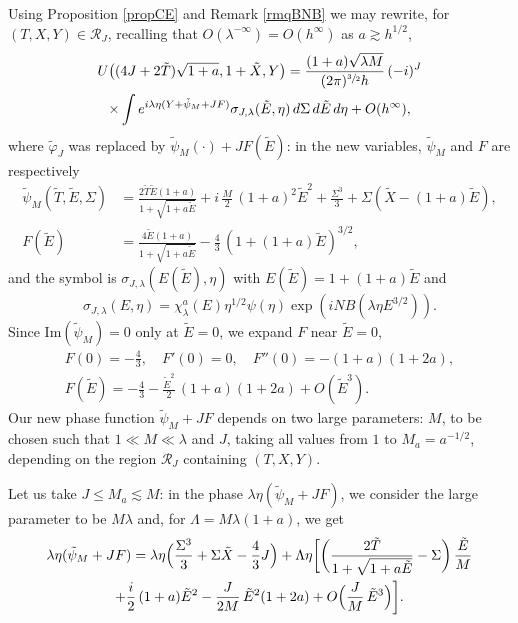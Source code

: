 \documentclass[11pt]{article}
\let\mathcal\mathscr
\theoremstyle{plain}
\theoremstyle{definition}
\newcommand{\DomainXYT}{\mathcal{R}}
\begin{document}
Using Proposition \ref{propCE} and Remark \ref{rmqBNB} we may rewrite, for $(T,X,Y)\in \DomainXYT_{J}$, recalling that $O(\lambda^{-\infty})=O(h^{\infty})$ as $a\gtrsim h^{1/2}$,
\begin{multline}
\label{eq:67}
U\bigl((4J+2\tilde T)\sqrt{1+a},1+\tilde X,Y\bigr) = \frac{(1+a)\sqrt {\lambda M}}{(2\pi)^{\sfrac 32}h}\, (-i)^{J} \\
\times \int e^{i\lambda\eta (Y+\tilde\psi_{M}+JF)} \sigma_{J,\lambda }(\tilde E,\eta)\,d\Sigma \,d{\tilde E} \,d\eta +O(h^{\infty}),
\end{multline}
where $\tilde\varphi_J$ was replaced by $\tilde\psi_{M}(\cdot)+JF({\tilde E})$: in the new variables, $\tilde\psi_{M}$ and $F$ are respectively
\begin{align*}
\tilde\psi_{M} (\tilde T,{\tilde E},\Sigma) & =\frac{2\tilde T {\tilde E}(1+a)}{1+\sqrt{1+a{\tilde E}}}+i\,\frac M2\, (1+a)^2 {\tilde E}^2+\frac{\Sigma^3}{3}+\Sigma(\tilde X-(1+a){\tilde E}), \\
\label{eq:68}
F({\tilde E}) & =\frac{4{\tilde E}(1+a)}{1+\sqrt{1+a{\tilde E}}}-\frac 43\, (1+(1+a){\tilde E})^{3/2},
\end{align*}
and the symbol is $\sigma_{J,\lambda}(E(\tilde E),\eta)$ with $E(\tilde E)=1+(1+a)\tilde E$ and
\[
\sigma_{J,\lambda}(E,\eta)=\chi^a_{\lambda}(E)\eta^{1/2}\psi(\eta) \exp(i NB(\lambda \eta E^{3/2})).
\]
Since $\mathrm{Im}(\tilde\psi_{M})=0$ only at ${\tilde E}=0$, we expand $F$ near ${\tilde E}=0$,
\begin{gather*}
F(0)=-\frac 43, \quad F'(0)=0, \quad F''(0)=-(1+a)(1+2a),\\
F({\tilde E})= -\frac 43-\frac{{\tilde E}^2}{2}\,(1+a)(1+2a)+O({\tilde E}^3).
\end{gather*}
Our new phase function $\tilde\psi_{M}+JF$ depends on two large parameters: $M$, to be chosen such that $1\ll M\ll\lambda $ and $J$, taking all values from $1$ to $M_a=a^{-1/2}$, depending on the region $\DomainXYT_J$ containing $(T,X,Y)$.

Let us take $J\leq M_a\lesssim M$: in the phase $\lambda\eta(\tilde\psi_{M}+JF)$, we consider the large parameter to be $M\lambda$ and, for $\Lambda= M \lambda (1+a)$, we get
\begin{multline*}\label{eq:phaUj}
\lambda\eta(\tilde\psi_{M}+JF)=\lambda \eta \Big(\frac{\Sigma^3}{3}+\Sigma \tilde X-\frac 43 J\Big)+
\Lambda \eta\biggl[\biggl(\frac{2\tilde T}{1+\sqrt{1+a{\tilde E}}}-\Sigma\biggr)\,\frac {\tilde E}M\\
+\frac i2\, (1+a){\tilde E}^2-\frac{J}{2M}\,{\tilde E}^2(1+2a)+O\Bigl(\frac{J}{M}\,{\tilde E}^3\Bigr)\biggr].
\end{multline*}
\end{document}
